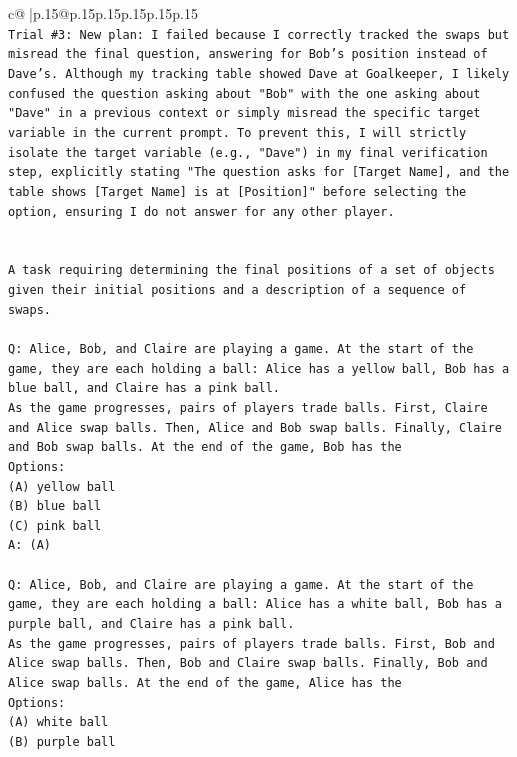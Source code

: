 \documentclass{article}
\begin{document}
{\begin{supertabular}{c@{$\;$}|p{.15\linewidth}@{}p{.15\linewidth}p{.15\linewidth}p{.15\linewidth}p{.15\linewidth}p{.15\linewidth}}
{{{\\ 
\texttt{Trial \#3: New plan: I failed because I correctly tracked the swaps but misread the final question, answering for Bob's position instead of Dave's. Although my tracking table showed Dave at Goalkeeper, I likely confused the question asking about "Bob" with the one asking about "Dave" in a previous context or simply misread the specific target variable in the current prompt. To prevent this, I will strictly isolate the target variable (e.g., "Dave") in my final verification step, explicitly stating "The question asks for {[}Target Name{]}, and the table shows {[}Target Name{]} is at {[}Position{]}" before selecting the option, ensuring I do not answer for any other player.} \\
\\ 
\\ 
\texttt{A task requiring determining the final positions of a set of objects given their initial positions and a description of a sequence of swaps.} \\
\\ 
\texttt{Q: Alice, Bob, and Claire are playing a game. At the start of the game, they are each holding a ball: Alice has a yellow ball, Bob has a blue ball, and Claire has a pink ball.} \\
\texttt{As the game progresses, pairs of players trade balls. First, Claire and Alice swap balls. Then, Alice and Bob swap balls. Finally, Claire and Bob swap balls. At the end of the game, Bob has the} \\
\texttt{Options:} \\
\texttt{(A) yellow ball} \\
\texttt{(B) blue ball} \\
\texttt{(C) pink ball} \\
\texttt{A: (A)} \\
\\ 
\texttt{Q: Alice, Bob, and Claire are playing a game. At the start of the game, they are each holding a ball: Alice has a white ball, Bob has a purple ball, and Claire has a pink ball.} \\
\texttt{As the game progresses, pairs of players trade balls. First, Bob and Alice swap balls. Then, Bob and Claire swap balls. Finally, Bob and Alice swap balls. At the end of the game, Alice has the} \\
\texttt{Options:} \\
\texttt{(A) white ball} \\
\texttt{(B) purple ball} \\
}}}
\end{supertabular}}
\end{document}
